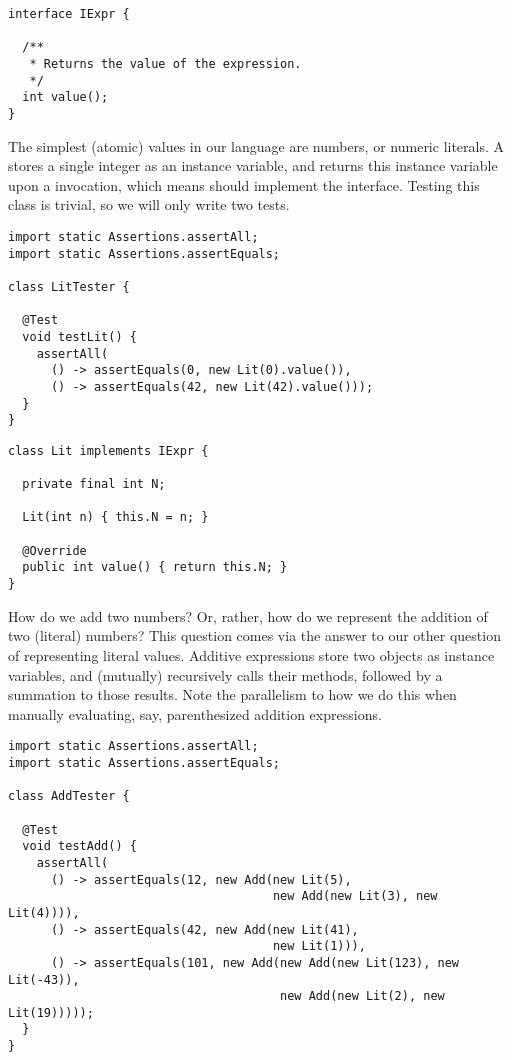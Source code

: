 \begin{lstlisting}[language=MyJava]
interface IExpr {

  /**
   * Returns the value of the expression.
   */
  int value();
}
\end{lstlisting}

The simplest (atomic) values in our language are numbers, or numeric literals. 
A  stores a single integer as an instance variable, and returns this instance variable upon a  invocation, which means  should implement the  interface. 
Testing this class is trivial, so we will only write two tests.

\enlargethispage{1\baselineskip}
\begin{lstlisting}[language=MyJava]
import static Assertions.assertAll;
import static Assertions.assertEquals;

class LitTester {

  @Test
  void testLit() {
    assertAll(
      () -> assertEquals(0, new Lit(0).value()),      
      () -> assertEquals(42, new Lit(42).value()));
  }
}
\end{lstlisting}

\newpage %
\begin{lstlisting}[language=MyJava]
class Lit implements IExpr {

  private final int N;

  Lit(int n) { this.N = n; }

  @Override
  public int value() { return this.N; }
}
\end{lstlisting}

How do we add two numbers? 
Or, rather, how do we represent the addition of two (literal) numbers? 
This question comes via the answer to our other question of representing literal values. 
Additive expressions store two  objects as instance variables, and (mutually) recursively calls their  methods, followed by a summation to those results. 
Note the parallelism to how we do this when manually evaluating, say, parenthesized addition expressions.

\begin{lstlisting}[language=MyJava]
import static Assertions.assertAll;
import static Assertions.assertEquals;

class AddTester {

  @Test
  void testAdd() {
    assertAll(
      () -> assertEquals(12, new Add(new Lit(5), 
                                     new Add(new Lit(3), new Lit(4)))),
      () -> assertEquals(42, new Add(new Lit(41), 
                                     new Lit(1))),
      () -> assertEquals(101, new Add(new Add(new Lit(123), new Lit(-43)),
                                      new Add(new Lit(2), new Lit(19)))));
  }
}
\end{lstlisting}

